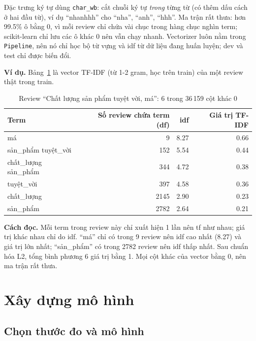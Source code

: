 Đặc trưng ký tự dùng \texttt{char\_wb}: cắt chuỗi ký tự \emph{trong} từng từ (có thêm dấu cách ở hai đầu từ), ví dụ ``nhanhhh'' cho ``nha'', ``anh'', ``hhh''.
Ma trận rất thưa: hơn 99.5\% ô bằng 0, vì mỗi review chỉ chứa vài chục trong hàng chục nghìn term; scikit-learn chỉ lưu các ô khác 0 nên vẫn chạy nhanh.
Vectorizer luôn nằm trong \texttt{Pipeline}, nên nó chỉ học bộ từ vựng và idf từ dữ liệu đang huấn luyện; dev và test chỉ được biến đổi.

\textbf{Ví dụ.} Bảng~\ref{tab:text-tfidf-example} là vector TF-IDF (từ 1-2 gram, học trên train) của một review thật trong train.

\begin{table}[H]
\centering
\caption{Review ``Chất lượng sản phẩm tuyệt vời, má'': 6 trong 36\,159 cột khác 0}
\label{tab:text-tfidf-example}
\begin{tabular}{lrrr}
\toprule
Term & Số review chứa term (df) & idf & Giá trị TF-IDF\\
\midrule
má & 9 & 8.27 & 0.66\\
sản\_phẩm tuyệt\_vời & 152 & 5.54 & 0.44\\
chất\_lượng sản\_phẩm & 344 & 4.72 & 0.38\\
tuyệt\_vời & 397 & 4.58 & 0.36\\
chất\_lượng & 2145 & 2.90 & 0.23\\
sản\_phẩm & 2782 & 2.64 & 0.21\\
\bottomrule
\end{tabular}
\end{table}

\textbf{Cách đọc.} Mỗi term trong review này chỉ xuất hiện 1 lần nên tf như nhau; giá trị khác nhau chỉ do idf. ``má'' chỉ có trong 9 review nên idf cao nhất (8.27) và giá trị lớn nhất; ``sản\_phẩm'' có trong 2782 review nên idf thấp nhất. Sau chuẩn hóa L2, tổng bình phương 6 giá trị bằng 1. Mọi cột khác của vector bằng 0, nên ma trận rất thưa.

\section{Xây dựng mô hình}
\label{sec:text-model}

\subsection{Chọn thước đo và mô hình}
\label{sec:text-metric}

